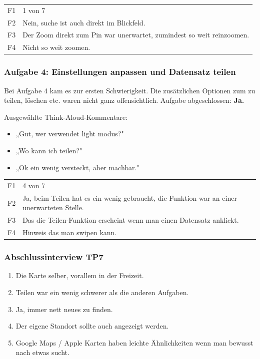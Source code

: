 \documentclass{article}
\begin{document}
\begin{tabular}{@{}lp{10cm}@{}}
  F1 & 1 von 7 \\
  F2 & Nein, suche ist auch direkt im Blickfeld. \\
  F3 & Der Zoom direkt zum Pin war unerwartet, zumindest so weit reinzoomen. \\
  F4 & Nicht so weit zoomen. \\
\end{tabular}

\subsubsection*{Aufgabe 4: Einstellungen anpassen und Datensatz teilen}

Bei Aufgabe 4 kam es zur ersten Schwierigkeit. Die zusätzlichen Optionen zum zu teilen, löschen etc. waren nicht ganz offensichtlich.
Aufgabe abgeschlossen: \textbf{Ja.}

\bigskip
Ausgewählte Think-Aloud-Kommentare:
\begin{itemize}
  \item „Gut, wer verwendet light modus?"
  \item „Wo kann ich teilen?"
  \item „Ok ein wenig versteckt, aber machbar."
\end{itemize}

\begin{tabular}{@{}lp{10cm}@{}}
  F1 & 4 von 7 \\
  F2 & Ja, beim Teilen hat es ein wenig gebraucht, die Funktion war an einer unerwarteten Stelle. \\
  F3 & Das die Teilen-Funktion erscheint wenn man einen Datensatz anklickt. \\
  F4 & Hinweis das man swipen kann. \\
\end{tabular}

\subsubsection*{Abschlussinterview TP7}

\begin{enumerate}
	\item Die Karte selber, vorallem in der Freizeit.
	\item Teilen war ein wenig schwerer als die anderen Aufgaben.
	\item Ja, immer nett neues zu finden.
	\item Der eigene Standort sollte auch angezeigt werden.
	\item Google Maps / Apple Karten haben leichte Ähnlichkeiten wenn man bewusst nach etwas sucht.
\end{enumerate}
\end{document}
